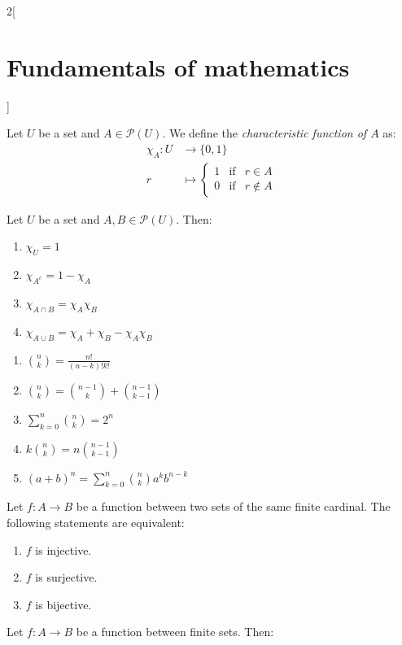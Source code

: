 \documentclass[../../../main.tex]{subfiles}
\begin{document}
\begin{multicols}{2}[\section{Fundamentals of mathematics}]
\begin{definition}
    Let $U$ be a set and $A\in\mathcal{P}(U)$. We define the \textit{characteristic function of $A$} as: 
    \begin{align*}
        \chi_A:U&\longrightarrow\{0,1\}\\
        r&\longmapsto \left\{
        \begin{array}{rcl}
        1 & \text{if} & r\in A \\
        0 & \text{if} & r\notin A
        \end{array}\right.
    \end{align*}
\end{definition}
\begin{prop}
    Let $U$ be a set and $A,B\in\mathcal{P}(U)$. Then:
    \begin{enumerate}
        \item $\chi_U=1$
        \item $\chi_{A^c}=1-\chi_A$
        \item $\chi_{A\cap B}=\chi_A\chi_B$
        \item $\chi_{A\cup B}=\chi_A+\chi_B-\chi_A\chi_B$
    \end{enumerate}
\end{prop}
\begin{prop}\hfill
    \begin{enumerate}
        \item $\binom{n}{k}=\frac{n!}{(n-k)!k!}$
        \item $\binom{n}{k}=\binom{n-1}{k}+\binom{n-1}{k-1}$
        \item $\sum_{k=0}^n\binom{n}{k}=2^n$
        \item $k\binom{n}{k}=n\binom{n-1}{k-1}$
        \item $(a+b)^n=\sum_{k=0}^n\binom{n}{k}a^kb^{n-k}$
    \end{enumerate}
\end{prop}
\begin{prop}
    Let $f:A\rightarrow B$ be a function between two sets of the same finite cardinal. The following statements are equivalent:
    \begin{enumerate}
        \item $f$ is injective.
        \item $f$ is surjective.
        \item $f$ is bijective.
    \end{enumerate}
\end{prop}
\begin{corollary}
    Let $f:A\rightarrow B$ be a function between finite sets. Then:

\end{corollary}
\end{multicols}
\end{document}

